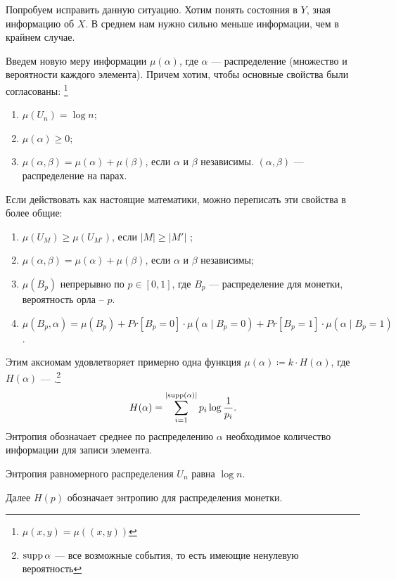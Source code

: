 Попробуем исправить данную ситуацию. Хотим понять состояния в $ Y$, зная информацию об $ X$. В среднем нам нужно сильно меньше информации, чем в крайнем случае.

Введем новую меру информации $  \mu ( \alpha )$, где $  \alpha $ --- распределение (множество и вероятности каждого элемента). Причем хотим, чтобы основные свойства были согласованы: \footnote{$ \mu(x, y) = \mu((x, y))$}
\begin{enumerate}
	\item $  \mu(U_n) = \log n$;
	\item $ \mu( \alpha ) \ge 0$;
	\item $\mu ( \alpha,  \beta ) = \mu ( \alpha ) + \mu ( \beta )$, если  $  \alpha $ и $  \beta $ независимы. $( \alpha,  \beta )$ --- распределение на парах.
\end{enumerate} 

Если действовать как настоящие математики, можно переписать эти свойства в более общие:
\begin{enumerate}
	\item $ \mu(U_{M}) \ge \mu(U_{M'})$, если $ \lvert M \rvert \ge \lvert M' \rvert $ ;
	\item $\mu ( \alpha,  \beta ) = \mu ( \alpha ) + \mu ( \beta )$, если  $  \alpha $ и $  \beta $ независимы;
	\item $ \mu(B_p)$ непрерывно по $ p \in [0, 1]$, где $ B_p  $ --- распределение для монетки, вероятность орла -- $ p$. 
	\item $ \mu(B_p, \alpha ) = \mu(B_p) + Pr[B_p = 0]\cdot \mu( \alpha \mid B_p = 0) + Pr[B_p = 1]\cdot \mu( \alpha \mid B_p = 1)$.
\end{enumerate} 

\begin{defn}[Энтропия]
	Этим аксиомам удовлетворяет примерно одна функция $  \mu( \alpha ) \coloneqq k \cdot H( \alpha )$, где $ H( \alpha )$ --- .\footnote{$ \operatorname{supp} \alpha $ --- все возможные события, то есть имеющие ненулевую вероятность}
\[
	H( \alpha ) = \sum_{i = 1}^{\lvert \operatorname{supp} ( \alpha ) \rvert } p_i \log \frac{1}{p_i}
.\] 
Энтропия обозначает среднее по распределению $  \alpha $ необходимое количество информации для записи элемента.
\end{defn}
\begin{note}
    Энтропия равномерного распределения $U_n$ равна $ \log n$.
\end{note}
\begin{note}
	Далее $ H(p) $ обозначает энтропию для распределения монетки.
\end{note}

